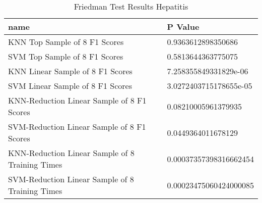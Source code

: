 \begin{table}
\centering
\caption{Friedman Test Results Hepatitis}
\label{tab:friedman_test_results_hepatitis}
\begin{tabular}{ll}
\toprule
name & P Value \\
\midrule
KNN Top Sample of 8 F1 Scores & 0.9363612898350686 \\
SVM Top Sample of 8 F1 Scores & 0.5813644363775075 \\
KNN Linear Sample of 8 F1 Scores & 7.258355849331829e-06 \\
SVM Linear Sample of 8 F1 Scores & 3.0272403715178655e-05 \\
KNN-Reduction Linear Sample of 8 F1 Scores & 0.08210005961379935 \\
SVM-Reduction Linear Sample of 8 F1 Scores & 0.0449364011678129 \\
KNN-Reduction Linear Sample of 8 Training Times & 0.00037357398316662454 \\
SVM-Reduction Linear Sample of 8 Training Times & 0.00023475060424000085 \\
\bottomrule
\end{tabular}
\end{table}
